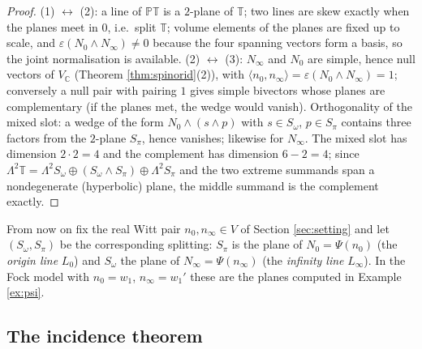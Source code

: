 \documentclass[11pt]{article}
\theoremstyle{definition}
\newcommand{\C}{\mathbb{C}}
\newcommand{\T}{\mathbb{T}}
\newcommand{\PT}{\mathbb{PT}}
\newcommand{\nO}{n_0}
\newcommand{\nInf}{n_\infty}
\newcommand{\ip}[2]{\langle #1, #2\rangle}
\newcommand{\Som}{S_\omega}
\newcommand{\Spi}{S_\pi}
\begin{document}
\begin{proof}
(1) $\leftrightarrow$ (2): a line of $\PT$ is a $2$-plane of $\T$; two lines are skew exactly when the planes meet in $0$, i.e.\ split $\T$; volume elements of the planes are fixed up to scale, and $\varepsilon(N_0\wedge N_\infty) \neq 0$ because the four spanning vectors form a basis, so the joint normalisation is available. (2) $\leftrightarrow$ (3): $N_\infty$ and $N_0$ are simple, hence null vectors of $V_\C$ (Theorem \ref{thm:spinorid}(2)), with $\ip{\nO}{\nInf} = \varepsilon(N_0\wedge N_\infty) = 1$; conversely a null pair with pairing $1$ gives simple bivectors whose planes are complementary (if the planes met, the wedge would vanish). Orthogonality of the mixed slot: a wedge of the form $N_0 \wedge (s\wedge p)$ with $s \in \Som$, $p \in \Spi$ contains three factors from the $2$-plane $\Spi$, hence vanishes; likewise for $N_\infty$. The mixed slot has dimension $2 \cdot 2 = 4$ and the complement has dimension $6 - 2 = 4$; since $\Lambda^2\T = \Lambda^2\Som \oplus (\Som\wedge\Spi) \oplus \Lambda^2\Spi$ and the two extreme summands span a nondegenerate (hyperbolic) plane, the middle summand is the complement exactly.
\end{proof}

From now on fix the real Witt pair $\nO, \nInf \in V$ of Section \ref{sec:setting} and let $(\Som, \Spi)$ be the corresponding splitting: $\Spi$ is the plane of $N_0 = \Psi(\nO)$ (the \emph{origin line} $L_0$) and $\Som$ the plane of $N_\infty = \Psi(\nInf)$ (the \emph{infinity line} $L_\infty$). In the Fock model with $\nO = w_1$, $\nInf = w_1'$ these are the planes computed in Example \ref{ex:psi}.

\subsection{The incidence theorem}\label{subsec:incidencethm}
\end{document}
